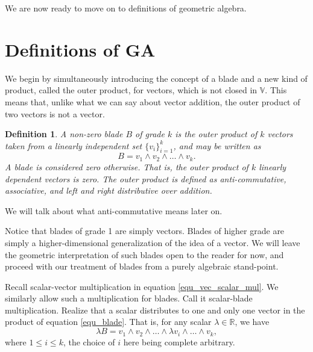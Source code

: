 \documentclass[12pt]{article}
\numberwithin{equation}{section}
\newcommand{\V}{\mathbb{V}}
\newcommand{\R}{\mathbb{R}}
\newtheorem{definition}{Definition}[section]
\begin{document}
We are now ready to move on to definitions of geometric algebra.

\section{Definitions of GA}

We begin by simultaneously introducing the concept of a blade and a new kind of
product, called the outer product, for vectors, which is not closed in $\V$.  This means
that, unlike what we can say about vector addition, the outer product of two vectors is not a vector.
\begin{definition}\label{def_blade}
A non-zero blade $B$ of grade $k$ is the outer product of $k$ vectors taken
from a linearly independent set $\{v_i\}_{i=1}^k$, and may be written as
\begin{equation}\label{equ_blade}
B = v_1\wedge v_2\wedge\dots\wedge v_k.
\end{equation}
A blade is considered zero otherwise.  That is, the outer product of $k$
linearly dependent vectors is zero.  The outer product is defined as
anti-commutative, associative, and left and right distributive over addition.
\end{definition}

We will talk about what anti-commutative means later on.

Notice that blades of grade 1 are simply vectors.  Blades of higher grade are simply
a higher-dimensional generalization of the idea of a vector.  We will leave the geometric
interpretation of such blades open to the reader for now, and proceed with our treatment of
blades from a purely algebraic stand-point.

Recall scalar-vector multiplication in equation \eqref{equ_vec_scalar_mul}.
We similarly allow such a multiplication for blades.  Call it scalar-blade multiplication.
Realize that a scalar distributes to one and only one vector in the product of
equation \eqref{equ_blade}.  That is, for any scalar $\lambda\in\R$,
we have
\begin{equation}
\lambda B = v_1\wedge v_2\wedge\dots\wedge \lambda v_i\wedge\dots\wedge v_k,
\end{equation}
where $1\leq i\leq k$, the choice of $i$ here being complete arbitrary.
\end{document}
